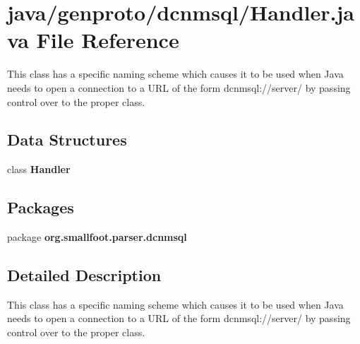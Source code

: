 \section{java/genproto/dcnmsql/\+Handler.java File Reference}
\label{dcnmsql_2Handler_8java}


This class has a specific naming scheme which causes it to be used when Java needs to open a connection to a U\+R\+L of the form dcnmsql\+://server/ by passing control over to the proper class.  


\subsection*{Data Structures}
\begin{DoxyCompactItemize}
\item 
class {\bf Handler}
\end{DoxyCompactItemize}
\subsection*{Packages}
\begin{DoxyCompactItemize}
\item 
package {\bf org.\+smallfoot.\+parser.\+dcnmsql}
\end{DoxyCompactItemize}


\subsection{Detailed Description}
This class has a specific naming scheme which causes it to be used when Java needs to open a connection to a U\+R\+L of the form dcnmsql\+://server/ by passing control over to the proper class. 

